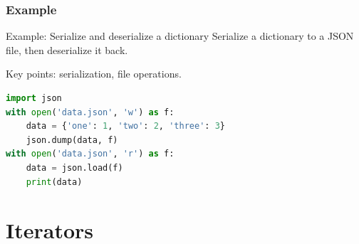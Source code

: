 \documentclass[beamer, en, version=2.0]{huangfusl-template}
\begin{document}
    \begin{frame}[fragile]
        \frametitle{Example}

        \begin{block}{Example: Serialize and deserialize a dictionary}
            Serialize a dictionary to a JSON file, then deserialize it back.
        \end{block}

        Key points: serialization, file operations.

        \pause

\begin{lstlisting}[language=python]
import json
with open('data.json', 'w') as f:
    data = {'one': 1, 'two': 2, 'three': 3}
    json.dump(data, f)
with open('data.json', 'r') as f:
    data = json.load(f)
    print(data)
\end{lstlisting}
    \end{frame}
    \section{Iterators}
\end{document}
